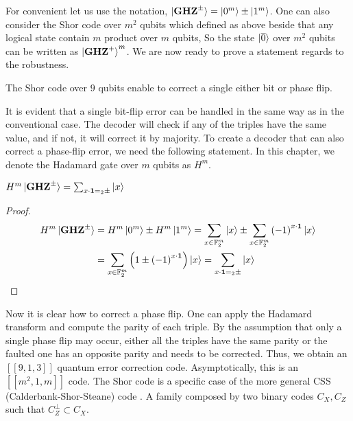 For convenient let us use the notation, $\ket{\mathbf{GHZ}^{\pm}} =  \ket{0^{m}} \pm  \ket{1^{m}}$. One can also consider the Shor code over $m^{2}$ qubits which defined as above beside that any logical state contain $m$ product over $m$ qubits, So the state $\ket{\overline{0}}$ over $m^{2}$ qubits can be written as $\ket{\mathbf{GHZ}^{+}}^{m}$. We are now ready to prove a statement regards to the robustness.  

\begin{lemma}
  The Shor code over $9$ qubits enable to correct a single either bit or phase flip.  
\end{lemma}
It is evident that a single bit-flip error can be handled in the same way as in the conventional case. The decoder will check if any of the triples have the same value, and if not, it will correct it by majority. To create a decoder that can also correct a phase-flip error, we need the following statement. In this chapter, we denote the Hadamard gate over $m$ qubits as $H^m$.
\begin{claim}
   $H^{m}\ket{\mathbf{GHZ}^{\pm}} = \sum_{ x \cdot \mathbf{1} =_2 \pm }{\ket{x} }$
\end{claim}

\begin{proof}

  \begin{equation*}
    \begin{split}
      H^{m}\ket{\mathbf{GHZ}^{\pm}} & = H^{m}\ket{0^{m}} \pm  H^{m}\ket{1^{m}} = \sum_{x \in \mathbb{F}_{2}^{m}}{\ket{x}} \pm  \sum_{x \in \mathbb{F}_{2}^{m}}{\left( -1 \right)^{x \cdot \mathbf{1}} \ket{x}} \\ & = \sum_{x \in \mathbb{F}_{2}^{m}}{ \left( 1 \pm \left( -1 \right)^{x \cdot \mathbf{1}}  \right) \ket{x} } =  \sum_{x \cdot \mathbf{1} =_2 \pm }{\ket{x} }
    \end{split}
  \end{equation*}
\end{proof}

Now it is clear how to correct a phase flip. One can apply the Hadamard transform and compute the parity of each triple. By the assumption that only a single phase flip may occur, either all the triples have the same parity or the faulted one has an opposite parity and needs to be corrected. Thus, we obtain an $\left[ \left[ 9,1,3 \right] \right]$ quantum error correction code. Asymptotically, this is an $\left[ \left[ m^{2}, 1, m \right] \right]$ code. The Shor code is a specific case of the more general CSS (Calderbank-Shor-Steane) code \cite{Calderbank_1996}. A family composed by two binary codes $C_{X}, C_{Z}$ such that $C_{Z}^{\perp} \subset C_{X}$. 

